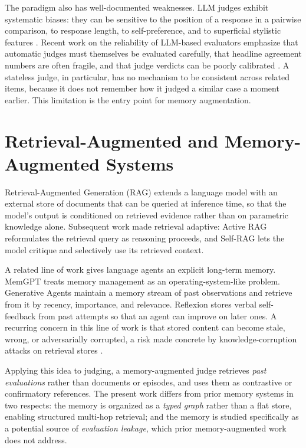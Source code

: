 \documentclass[14pt,a4paper]{extreport}
\begin{document}
The paradigm also has well-documented weaknesses. LLM judges exhibit systematic biases: they can be sensitive to the position of a response in a pairwise comparison, to response length, to self-preference, and to superficial stylistic features \cite{llm_judge_bias2024, position_bias2024}. Recent work on the reliability of LLM-based evaluators \cite{chateval2023, llm_judge_agreement2024} emphasize that automatic judges must themselves be evaluated carefully, that headline agreement numbers are often fragile, and that judge verdicts can be poorly calibrated \cite{judge_calibration2024}. A stateless judge, in particular, has no mechanism to be consistent across related items, because it does not remember how it judged a similar case a moment earlier. This limitation is the entry point for memory augmentation.

\section{Retrieval-Augmented and Memory-Augmented Systems}

Retrieval-Augmented Generation (RAG) \cite{rag_original2020} extends a language model with an external store of documents that can be queried at inference time, so that the model's output is conditioned on retrieved evidence rather than on parametric knowledge alone. Subsequent work made retrieval adaptive: Active RAG \cite{active_rag2023} reformulates the retrieval query as reasoning proceeds, and Self-RAG \cite{self_rag2023} lets the model critique and selectively use its retrieved context.

A related line of work gives language agents an explicit long-term memory. MemGPT \cite{memgpt2023} treats memory management as an operating-system-like problem. Generative Agents \cite{generative_agents2023} maintain a memory stream of past observations and retrieve from it by recency, importance, and relevance. Reflexion \cite{reflexion2023} stores verbal self-feedback from past attempts so that an agent can improve on later ones. A recurring concern in this line of work is that stored content can become stale, wrong, or adversarially corrupted, a risk made concrete by knowledge-corruption attacks on retrieval stores \cite{rag_poisoning2024}.

Applying this idea to judging, a memory-augmented judge retrieves \emph{past evaluations} rather than documents or episodes, and uses them as contrastive or confirmatory references. The present work differs from prior memory systems in two respects: the memory is organized as a \emph{typed graph} rather than a flat store, enabling structured multi-hop retrieval; and the memory is studied specifically as a potential source of \emph{evaluation leakage}, which prior memory-augmented work does not address.
\end{document}
